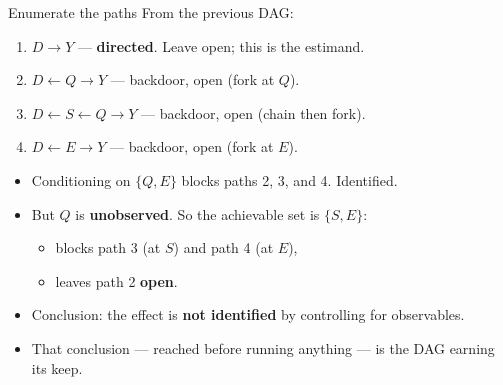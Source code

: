 \documentclass[
  11pt,
  ignorenonframetext,
  aspectratio=169,
]{beamer}
\providecommand{\tightlist}{%
  \setlength{\itemsep}{0pt}\setlength{\parskip}{0pt}}
\begin{document}
\begin{frame}{Enumerate the paths}
\protect{}\label{enumerate-the-paths}
From the previous DAG:

\begin{enumerate}
\tightlist
\item
  \(D \to Y\) --- \textbf{directed}. Leave open; this is the estimand.
\item
  \(D \leftarrow Q \to Y\) --- backdoor, open (fork at \(Q\)).
\item
  \(D \leftarrow S \leftarrow Q \to Y\) --- backdoor, open (chain then
  fork).
\item
  \(D \leftarrow E \to Y\) --- backdoor, open (fork at \(E\)).
\end{enumerate}

\vspace{0.5em}

\begin{itemize}
\tightlist
\item
  Conditioning on \(\{Q, E\}\) blocks paths 2, 3, and 4. Identified.
\item
  But \(Q\) is \textbf{unobserved}. So the achievable set is
  \(\{S, E\}\):

  \begin{itemize}
  \tightlist
  \item
    blocks path 3 (at \(S\)) and path 4 (at \(E\)),
  \item
    leaves path 2 \textbf{open}.
  \end{itemize}
\item
  Conclusion: the effect is \textbf{not identified} by controlling for
  observables.
\item
  That conclusion --- reached before running anything --- is the DAG
  earning its keep.
\end{itemize}
\end{frame}
\end{document}
